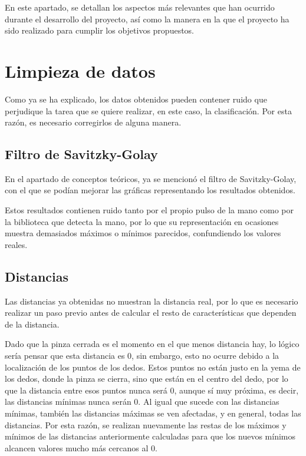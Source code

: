 En este apartado, se detallan los aspectos más relevantes que han ocurrido durante el desarrollo del proyecto, así como la manera en la que el proyecto ha sido realizado para cumplir los objetivos propuestos.

\section{Limpieza de datos}
Como ya se ha explicado, los datos obtenidos pueden contener ruido que perjudique la tarea que se quiere realizar, en este caso, la clasificación. Por esta razón, es necesario corregirlos de alguna manera.

\subsection{Filtro de Savitzky-Golay}
En el apartado de conceptos teóricos, ya se mencionó el filtro de Savitzky-Golay, con el que se podían mejorar las gráficas representando los resultados obtenidos.

Estos resultados contienen ruido tanto por el propio pulso de la mano como por la biblioteca que detecta la mano, por lo que su representación en ocasiones muestra demasiados máximos o mínimos parecidos, confundiendo los valores reales.

\subsection{Distancias} 
Las distancias ya obtenidas no muestran la distancia  real, por lo que es necesario realizar un paso previo antes de calcular el resto de características que dependen de la distancia. 

Dado que la pinza cerrada es el momento en el que menos distancia hay, lo lógico sería pensar que esta distancia es 0, sin embargo, esto no ocurre debido a la localización de los puntos de los dedos. Estos puntos no están justo en la yema de los dedos, donde la pinza se cierra, sino que están en el centro del dedo, por lo que la distancia entre esos puntos nunca será 0, aunque sí muy próxima, es decir, las distancias mínimas nunca serán 0. Al igual que sucede con las distancias mínimas, también las distancias máximas se ven afectadas, y en general, todas las distancias. Por esta razón, se realizan nuevamente las restas de los máximos y mínimos de las distancias anteriormente calculadas para que los nuevos mínimos alcancen valores mucho más cercanos al 0. 

